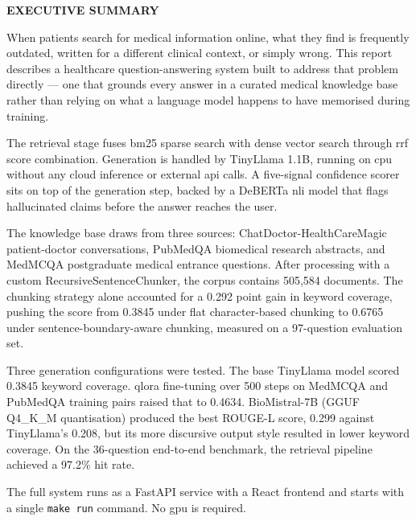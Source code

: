 \begin{center}
	\Large{\textbf{EXECUTIVE SUMMARY}}
\end{center}
\vspace{1em}
\normalsize

When patients search for medical information online, what they find is frequently outdated, written for a different clinical context, or simply wrong. This report describes a healthcare question-answering system built to address that problem directly --- one that grounds every answer in a curated medical knowledge base rather than relying on what a language model happens to have memorised during training.

The retrieval stage fuses \ac{bm25} sparse search with dense vector search through \ac{rrf} score combination. Generation is handled by TinyLlama 1.1B, running on \ac{cpu} without any cloud inference or external \ac{api} calls. A five-signal confidence scorer sits on top of the generation step, backed by a DeBERTa \ac{nli} model that flags hallucinated claims before the answer reaches the user.

The knowledge base draws from three sources: ChatDoctor-HealthCareMagic patient-doctor conversations, PubMedQA biomedical research abstracts, and MedMCQA postgraduate medical entrance questions. After processing with a custom RecursiveSentenceChunker, the corpus contains 505,584 documents. The chunking strategy alone accounted for a 0.292 point gain in keyword coverage, pushing the score from 0.3845 under flat character-based chunking to 0.6765 under sentence-boundary-aware chunking, measured on a 97-question evaluation set.

Three generation configurations were tested. The base TinyLlama model scored 0.3845 keyword coverage. \ac{qlora} fine-tuning over 500 steps on MedMCQA and PubMedQA training pairs raised that to 0.4634. BioMistral-7B (GGUF Q4\_K\_M\allowbreak{} quantisation) produced the best ROUGE-L score, 0.299 against TinyLlama's 0.208, but its more discursive output style resulted in lower keyword coverage. On the 36-question end-to-end benchmark, the retrieval pipeline achieved a 97.2\% hit rate.

The full system runs as a FastAPI service with a React frontend and starts with a single \texttt{make\allowbreak{} run} command. No \ac{gpu} is required.
